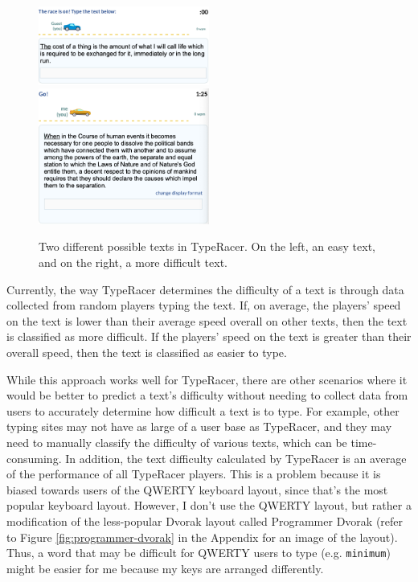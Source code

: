 \documentclass[12pt]{article}
\begin{document}
\begin{figure}[H]
	\caption{Two different possible texts in TypeRacer. On the left, an easy text, and on the right, a more difficult text.}
	\includegraphics[width=0.5\textwidth]{easy-text.png}
	\includegraphics[width=0.5\textwidth]{hard-text.png}
\end{figure}

Currently, the way TypeRacer determines the difficulty of a text is through data collected from random players typing the text. If, on average, the players' speed on the text is lower than their average speed overall on other texts, then the text is classified as more difficult. If the players' speed on the text is greater than their overall speed, then the text is classified as easier to type.

While this approach works well for TypeRacer, there are other scenarios where it would be better to predict a text's difficulty without needing to collect data from users to accurately determine how difficult a text is to type. For example, other typing sites may not have as large of a user base as TypeRacer, and they may need to manually classify the difficulty of various texts, which can be time-consuming. In addition, the text difficulty calculated by TypeRacer is an average of the performance of all TypeRacer players. This is a problem because it is biased towards users of the QWERTY keyboard layout, since that's the most popular keyboard layout. However, I don't use the QWERTY layout, but rather a modification of the less-popular Dvorak layout called Programmer Dvorak (refer to Figure \ref{fig:programmer-dvorak} in the Appendix for an image of the layout). Thus, a word that may be difficult for QWERTY users to type (e.g. \texttt{minimum}) might be easier for me because my keys are arranged differently.
\end{document}
